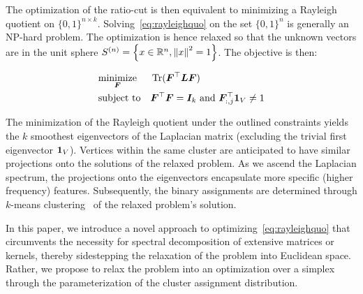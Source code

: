 The optimization of the ratio-cut is then equivalent to minimizing a Rayleigh
quotient on $\{0,1\}^{n\times k}$. Solving~\cref{eq:rayleighquo} on the set
$\{0,1\}^n$ is generally an NP-hard problem. The optimization is hence relaxed so
that the unknown vectors are in the unit sphere $S^{(n)} = \left\lbrace x \in \mathbb{R}^n,
\left\lVert x\right\rVert^2 =1\right\rbrace$. The objective is then:

\begin{align}
	\label{eq:rayleighquo}
	\begin{aligned}
		 & \underset{{\bm{F}}}{\text{minimize}} &  & \operatorname{Tr}({\bm{F}}^\top {\bm{L}} {\bm{F}} )                                      \\
		 & \text{subject to}               &  & {\bm{F}}^\top {\bm{F}} = {\bm{I}}_k \text{ and } {\bm{F}}_{:,j}^\top\bm{1}_{V}\neq 1
	\end{aligned}
\end{align}

The minimization of the Rayleigh quotient under the outlined constraints yields the
$k$ smoothest eigenvectors of the Laplacian matrix (excluding the trivial first
eigenvector $\bm{1}_{V}$). Vertices within the same cluster are anticipated to have
similar projections onto the solutions of the relaxed problem. As we ascend the
Laplacian spectrum, the projections onto the eigenvectors encapsulate more specific
(higher frequency) features. Subsequently, the binary assignments are determined
through $k$-means clustering~\citep{standardspectral} of the relaxed problem's
solution.

In this paper, we introduce a novel approach to optimizing~\cref{eq:rayleighquo}
that circumvents the necessity for spectral decomposition of extensive matrices or
kernels, thereby sidestepping the relaxation of the problem into Euclidean space.
Rather, we propose to relax the problem into an optimization over a simplex through
the parameterization of the cluster assignment distribution.
